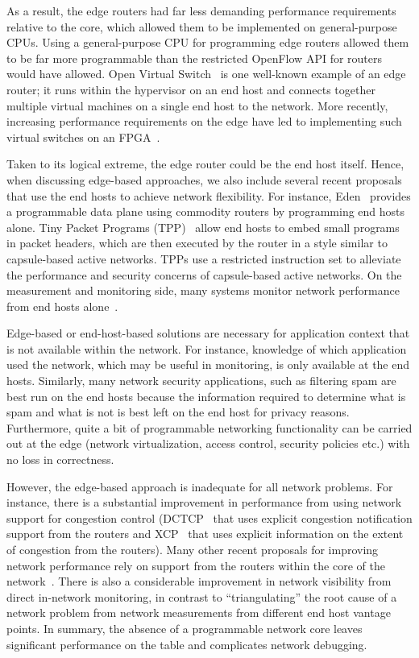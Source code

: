 As a result, the edge routers had far less demanding performance requirements
relative to the core, which allowed them to be implemented on general-purpose
CPUs.  Using a general-purpose CPU for programming edge routers allowed them to
be far more programmable than the restricted OpenFlow API for routers would
have allowed. Open Virtual Switch~\cite{openvswitch} is one well-known example
of an edge router; it runs within the hypervisor on an end host and connects
together multiple virtual machines on a single end host to the network.  More
recently, increasing performance requirements on the edge have led to
implementing such virtual switches on an FPGA~\cite{daniel_firestone_nsdi}.

Taken to its logical extreme, the edge router could be the end host itself.
Hence, when discussing edge-based approaches, we also include several recent
proposals that use the end hosts to achieve network flexibility. For instance,
Eden~\cite{eden} provides a programmable data plane using commodity routers by
programming end hosts alone.  Tiny Packet Programs (TPP)~\cite{tpp} allow end
hosts to embed small programs in packet headers, which are then executed by the
router in a style similar to capsule-based active networks. TPPs use a
restricted instruction set to alleviate the performance and security concerns
of capsule-based active networks. On the measurement and monitoring side, many
systems monitor network performance from end hosts alone~\cite{netpoirot,
minlan-snap, dapper-sosr, trumpet, azure-smartnic}.

Edge-based or end-host-based solutions are necessary for application context
that is not available within the network. For instance, knowledge of which
application used the network, which may be useful in monitoring, is only
available at the end hosts.  Similarly, many network security applications,
such as filtering spam are best run on the end hosts because the information
required to determine what is spam and what is not is best left on the end host
for privacy reasons. Furthermore, quite a bit of programmable networking
functionality can be carried out at the edge (\eg network virtualization,
access control, security policies etc.) with no loss in correctness.

However, the edge-based approach is inadequate for all network problems. For
instance, there is a substantial improvement in performance from using network
support for congestion control (\eg DCTCP~\cite{dctcp} that uses explicit
congestion notification support from the routers and XCP~\cite{xcp} that uses
explicit information on the extent of congestion from the routers). Many other
recent proposals for improving network performance rely on support from the
routers within the core of the network~\cite{pFabric, pias, d3, rcp, detail,
conga, letflow}. There is also a considerable improvement in network visibility
from direct in-network monitoring, in contrast to ``triangulating'' the root cause of a
network problem from network measurements from different end host vantage
points.  In summary, the absence of a programmable network core leaves
significant performance on the table and complicates network debugging.


